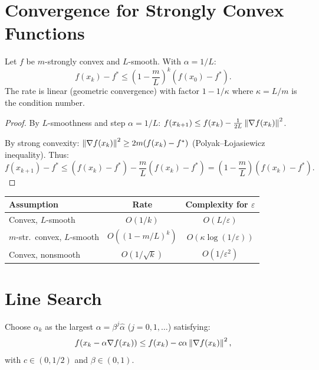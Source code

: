 \section{Convergence for Strongly Convex Functions}

\begin{theorem}
\label{thm:conv_strong}
Let $f$ be $m$-strongly convex and $L$-smooth. With $\alpha = 1/L$:
\[
    f(x_k) - f^* \leq \left(1 - \frac{m}{L}\right)^k (f(x_0) - f^*).
\]
The rate is linear (geometric convergence) with factor $1 - 1/\kappa$ where
$\kappa = L/m$ is the condition number.
\end{theorem}

\begin{proof}
By $L$-smoothness and step $\alpha = 1/L$:
$f(x_{k+1}) \leq f(x_k) - \frac{1}{2L}\left\| \nabla f(x_k) \right\|^2$.

By strong convexity: $\left\| \nabla f(x_k) \right\|^2 \geq 2m(f(x_k) - f^*)$
(Polyak--\L{}ojasiewicz inequality). Thus:
\[
    f(x_{k+1}) - f^* \leq (f(x_k) - f^*) - \frac{m}{L}(f(x_k) - f^*)
    = \left(1 - \frac{m}{L}\right)(f(x_k) - f^*).
\]
\end{proof}

\begin{keyformulas}[title=\textbf{Convergence Rate Summary}]
\begin{center}
\renewcommand{\arraystretch}{1.3}
\begin{tabular}{lcc}
\toprule
\textbf{Assumption} & \textbf{Rate} & \textbf{Complexity for $\varepsilon$} \\
\midrule
Convex, $L$-smooth & $O(1/k)$ & $O(L/\varepsilon)$ \\
$m$-str.\ convex, $L$-smooth & $O((1-m/L)^k)$ & $O(\kappa\log(1/\varepsilon))$ \\
Convex, nonsmooth & $O(1/\sqrt{k})$ & $O(1/\varepsilon^2)$ \\
\bottomrule
\end{tabular}
\end{center}
\end{keyformulas}

\section{Line Search}

\begin{definition}
Choose $\alpha_k$ as the largest $\alpha = \beta^j \hat{\alpha}$ ($j = 0,1,\ldots$)
satisfying:
\[
    f(x_k - \alpha\nabla f(x_k)) \leq f(x_k) - c\alpha\left\| \nabla f(x_k) \right\|^2,
\]
with $c \in (0, 1/2)$ and $\beta \in (0,1)$.
\end{definition}

